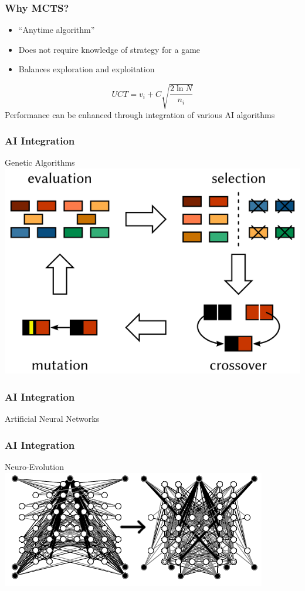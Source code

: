 \documentclass{beamer}
\begin{document}
\begin{frame}
\frametitle{Why MCTS?}
\begin{itemize}
\item ``Anytime algorithm''
\item Does not require knowledge of strategy for a game
\item Balances exploration and exploitation
\end{itemize}
 \[UCT = v_i +C\sqrt{\frac{2\ln N}{n_i}}\]
 Performance can be enhanced through integration of various AI algorithms
\end{frame}

\begin{frame}
\frametitle{AI Integration}
\vspace{-0.25in}
\begin{center}
Genetic Algorithms\\
\includegraphics[scale=.25]{images/ga1.png}
\end{center}
\end{frame}

\begin{frame}
\frametitle{AI Integration}
\vspace{-0.25in}
\begin{center}
Artificial Neural Networks\\

\end{center}
\end{frame}

\begin{frame}
\frametitle{AI Integration}
\vspace{-0.25in}
\begin{center}
Neuro-Evolution\\
\includegraphics[scale=.75]{images/hyperneatnets2.png}
\end{center}
\end{frame}
\end{document}
